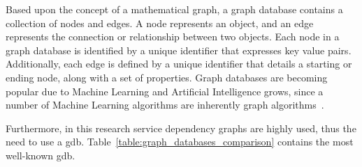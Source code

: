 \newpage

Based upon the concept of a mathematical graph, a graph database contains a collection of nodes and edges. A node represents an object, and an edge represents the connection or relationship between two objects. Each node in a graph database is identified by a unique identifier that expresses key value pairs. Additionally, each edge is defined by a unique identifier that details a starting or ending node, along with a set of properties. Graph databases are becoming popular due to Machine Learning and Artificial Intelligence grows, since a number of Machine Learning algorithms are inherently graph algorithms~\cite{FavioVazquez2019}.

Furthermore, in this research service dependency graphs are highly used, thus the need to use a \gls{gdb}. Table~\ref{table:graph_databases_comparison} contains the most well-known \gls{gdb}.

